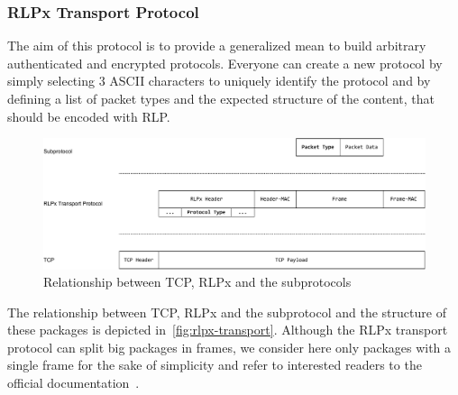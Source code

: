 \subsubsection{RLPx Transport Protocol}
\label{sec:rlpx-transport-protocol}

The aim of this protocol is to provide a generalized mean to build arbitrary
authenticated and encrypted protocols. Everyone can create a new protocol by 
simply selecting $3$ ASCII characters to uniquely identify the protocol and by
defining a list of packet types and the expected structure of the content, that 
should be encoded with RLP.

\begin{figure}
    \begin{center}
        \includegraphics[width=\textwidth]{./res/img/rlpx-transport}
        \caption{Relationship between TCP, RLPx and the subprotocols}
        \label{fig:rlpx-transport}
    \end{center}
\end{figure}

The relationship between TCP, RLPx and the subprotocol and the structure of
these packages is depicted in~\autoref{fig:rlpx-transport}. Although the RLPx
transport protocol can split big packages in frames, we consider here only 
packages with a single frame for the sake of simplicity and refer to interested
readers to the official documentation~\cite{rlpx}.

